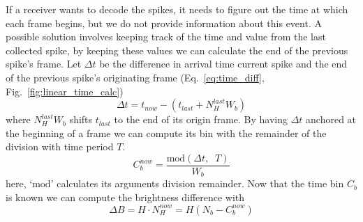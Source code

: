 \documentclass[conference]{IEEEtran}
\begin{document}
If a receiver wants to decode the spikes, it needs to figure out the time at which each frame begins, but we do not provide information about this event. A possible solution involves keeping track of the time and value from the last collected spike, by keeping these values we can calculate the end of the previous spike's frame. Let $\Delta t$ be the difference in arrival time current spike and the end of the previous spike's originating frame (Eq.~\ref{eq:time_diff}, Fig.~\ref{fig:linear_time_calc})
\begin{equation}
\Delta t = t_{now} -  \left(t_{last} + N_{H}^{last}W_{b}\right)
\label{eq:time_diff}
\end{equation}
where $N_{H}^{last}W_{b}$ shifts $t_{last}$ to the end of its origin frame. By having $\Delta t$ anchored at the beginning of a frame we can compute its bin with the remainder of the division with time period $T$.
\begin{equation}
C^{now}_{b} = \frac{ \mathrm{mod}\left(\Delta t, \;\; T\right) }{ W_{b} }
\label{eq:bin_compute}
\end{equation}
here, `$\mathrm{mod}$' calculates its arguments division remainder. Now that the time bin $C_{b}$ is known we can compute the brightness difference with
\begin{equation}
 \Delta B = H\cdot N_{H}^{now} =  H\left(N_{b} - C^{now}_{b}\right) 
 \label{eq:new_Nh_linear}
\end{equation}
\end{document}
